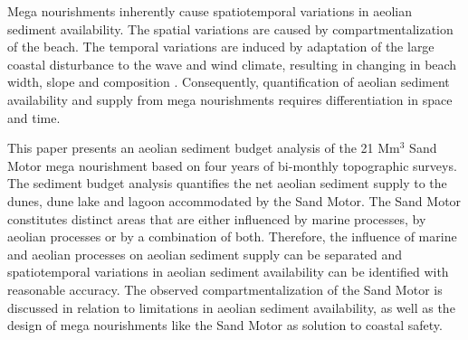 Mega nourishments inherently cause spatiotemporal variations in
aeolian sediment availability. The spatial variations are caused by
compartmentalization of the beach. The temporal variations are induced
by adaptation of the large coastal disturbance to the wave and wind
climate, resulting in changing in beach width, slope and composition
\citep{deSchipper2016}. Consequently, quantification of aeolian
sediment availability and supply from mega nourishments requires
differentiation in space and time.

This paper presents an aeolian sediment budget analysis of the 21
$\mathrm{Mm^3}$ Sand Motor mega nourishment based on four years of
bi-monthly topographic surveys. The sediment budget analysis
quantifies the net aeolian sediment supply to the dunes, dune lake and
lagoon accommodated by the Sand Motor. The Sand Motor constitutes
distinct areas that are either influenced by marine processes, by
aeolian processes or by a combination of both. Therefore, the
influence of marine and aeolian processes on aeolian sediment supply
can be separated and spatiotemporal variations in aeolian sediment
availability can be identified with reasonable accuracy. The observed
compartmentalization of the Sand Motor is discussed in relation to
limitations in aeolian sediment availability, as well as the design of
mega nourishments like the Sand Motor as solution to coastal safety.




